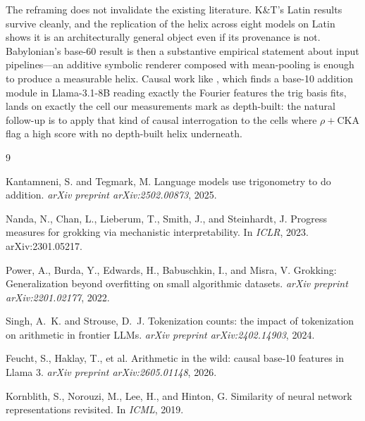 \documentclass[10pt,letterpaper]{article}
\begin{document}
The reframing does not invalidate the existing literature. K\&T's
Latin results survive cleanly, and the replication of the helix
across eight models on Latin shows it is an architecturally general
object even if its provenance is not. Babylonian's base-60 result
is then a substantive empirical statement about input
pipelines---an additive symbolic renderer composed with mean-pooling
is enough to produce a measurable helix. Causal work like
\citet{feucht2026wild}, which finds a base-10 addition module in
Llama-3.1-8B reading exactly the Fourier features the trig basis
fits, lands on exactly the cell our measurements mark as
depth-built: the natural follow-up is to apply that kind of causal
interrogation to the cells where $\rho + \text{CKA}$ flag a high
score with no depth-built helix underneath.

{\small
\begin{thebibliography}{9}

Kantamneni, S. and Tegmark, M.
\newblock Language models use trigonometry to do addition.
\newblock \emph{arXiv preprint arXiv:2502.00873}, 2025.

Nanda, N., Chan, L., Lieberum, T., Smith, J., and Steinhardt, J.
\newblock Progress measures for grokking via mechanistic interpretability.
\newblock In \emph{ICLR}, 2023. arXiv:2301.05217.

Power, A., Burda, Y., Edwards, H., Babuschkin, I., and Misra, V.
\newblock Grokking: Generalization beyond overfitting on small algorithmic datasets.
\newblock \emph{arXiv preprint arXiv:2201.02177}, 2022.

Singh, A.~K. and Strouse, D.~J.
\newblock Tokenization counts: the impact of tokenization on arithmetic in frontier LLMs.
\newblock \emph{arXiv preprint arXiv:2402.14903}, 2024.

Feucht, S., Haklay, T., et al.
\newblock Arithmetic in the wild: causal base-10 features in Llama 3.
\newblock \emph{arXiv preprint arXiv:2605.01148}, 2026.

Kornblith, S., Norouzi, M., Lee, H., and Hinton, G.
\newblock Similarity of neural network representations revisited.
\newblock In \emph{ICML}, 2019.

\end{thebibliography}
}
\end{document}
